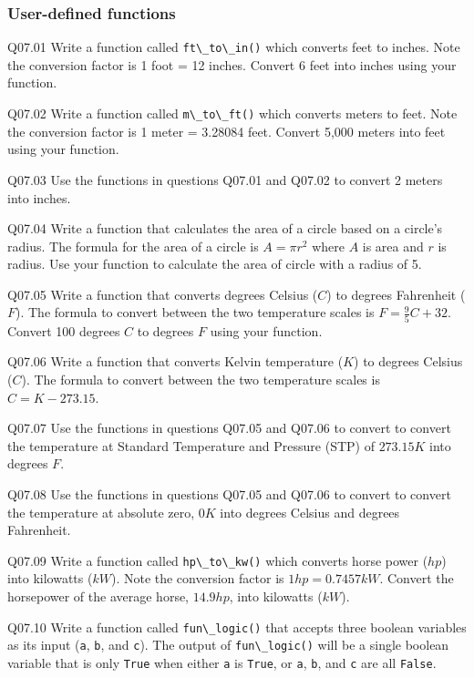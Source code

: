 \documentclass{book}
\newenvironment{problems}{}{}  %
\newcommand{\passthrough}[1]{#1}
\begin{document}
    
        \begin{problems}
        \hypertarget{user-defined-functions}{%
\subsubsection{User-defined functions}\label{user-defined-functions}}

Q07.01 Write a function called \passthrough{\lstinline!ft\_to\_in()!}
which converts feet to inches. Note the conversion factor is 1 foot = 12
inches. Convert 6 feet into inches using your function.

Q07.02 Write a function called \passthrough{\lstinline!m\_to\_ft()!}
which converts meters to feet. Note the conversion factor is 1 meter =
3.28084 feet. Convert 5,000 meters into feet using your function.

Q07.03 Use the functions in questions Q07.01 and Q07.02 to convert 2
meters into inches.

Q07.04 Write a function that calculates the area of a circle based on a
circle's radius. The formula for the area of a circle is \(A = \pi r^2\)
where \(A\) is area and \(r\) is radius. Use your function to calculate
the area of circle with a radius of 5.

Q07.05 Write a function that converts degrees Celsius (\(C\)) to degrees
Fahrenheit (\(F\)). The formula to convert between the two temperature
scales is \(F = \frac{9}{5} C + 32\). Convert 100 degrees \(C\) to
degrees \(F\) using your function.

Q07.06 Write a function that converts Kelvin temperature (\(K\)) to
degrees Celsius (\(C\)). The formula to convert between the two
temperature scales is \(C = K - 273.15\).

Q07.07 Use the functions in questions Q07.05 and Q07.06 to convert to
convert the temperature at Standard Temperature and Pressure (STP) of
\(273.15 K\) into degrees \(F\).

Q07.08 Use the functions in questions Q07.05 and Q07.06 to convert to
convert the temperature at absolute zero, \(0 K\) into degrees Celsius
and degrees Fahrenheit.

Q07.09 Write a function called \passthrough{\lstinline!hp\_to\_kw()!}
which converts horse power (\(hp\)) into kilowatts (\(kW\)). Note the
conversion factor is \(1 hp = 0.7457 kW\). Convert the horsepower of the
average horse, \(14.9 hp\), into kilowatts (\(kW\)).

Q07.10 Write a function called \passthrough{\lstinline!fun\_logic()!}
that accepts three boolean variables as its input
(\passthrough{\lstinline!a!}, \passthrough{\lstinline!b!}, and
\passthrough{\lstinline!c!}). The output of
\passthrough{\lstinline!fun\_logic()!} will be a single boolean variable
that is only \passthrough{\lstinline!True!} when either
\passthrough{\lstinline!a!} is \passthrough{\lstinline!True!}, or
\passthrough{\lstinline!a!}, \passthrough{\lstinline!b!}, and
\passthrough{\lstinline!c!} are all \passthrough{\lstinline!False!}.


\end{problems}
\end{document}
